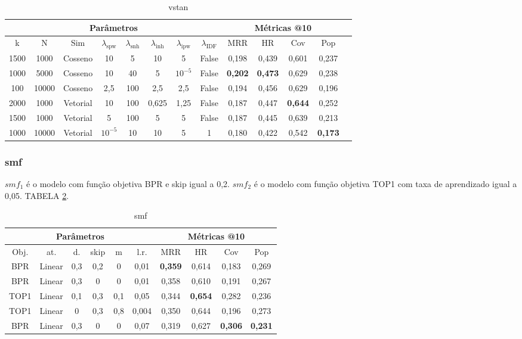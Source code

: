 \begin{table}[htbp]
    \centering
    \begin{tabular}{|c|c|c|c|c|c|c|c|c|c|c|c|c|}
      \hline
      \multicolumn{8}{|c|}{Parâmetros} & \multicolumn{4}{c|}{Métricas @10} \\
      \hline
      k & N & Sim & $\lambda_{\text{spw}}$ & $\lambda_{\text{snh}}$ & $\lambda_{\text{inh}}$ & $\lambda_{\text{ipw}}$ & $\lambda_{\text{IDF}}$ & MRR & HR & Cov & Pop \\
      \hline
      1500 & 1000 & Cosseno & 10 & 5 & 10 & 5 & False & 0,198 & 0,439 & 0,601 & 0,237 \\
      \hline
      1000 & 5000 & Cosseno & 10 & 40 & 5 & $10^{-5}$ & False & \textbf{0,202} & \textbf{0,473} & 0,629 & 0,238 \\
      \hline
      100 & 10000 & Cosseno & 2,5 & 100 & 2,5 & 2,5 & False & 0,194 & 0,456 & 0,629 & 0,196 \\
      \hline
      2000 & 1000 & Vetorial & 10 & 100 & 0,625 & 1,25 & False & 0,187 & 0,447 & \textbf{0,644} & 0,252 \\
      \hline
      1500 & 1000 & Vetorial & 5 & 100 & 5 & 5 & False & 0,187 & 0,445 & 0,639 & 0,213 \\
      \hline
      1000 & 10000 & Vetorial & $10^{-5}$ & 10 & 10 & 5 & 1 & 0,180 & 0,422 & 0,542 & \textbf{0,173} \\
      \hline
    \end{tabular}
    \caption{vstan}
    \label{app:vstan2}
  \end{table}

\subsubsection{smf}
$smf_{1}$ é o modelo com função objetiva BPR e skip igual a 0,2.
$smf_{2}$ é o modelo com função objetiva TOP1 com taxa de aprendizado igual a 0,05.
TABELA \ref{app:smf2}.
\begin{table}[htbp]
  \centering
  \begin{tabular}{|c|c|c|c|c|c|c|c|c|c|}
    \hline
      \multicolumn{6}{|c|}{Parâmetros} & \multicolumn{4}{c|}{Métricas @10} \\
      \hline
      Obj. & at. & d. & skip & m & l.r. & MRR & HR & Cov & Pop \\
      \hline
      BPR & Linear & 0,3 & 0,2 & 0 & 0,01 & \textbf{0,359} & 0,614 & 0,183 & 0,269 \\
      \hline
      BPR & Linear & 0,3 & 0 & 0 & 0,01 & 0,358 & 0,610 & 0,191 & 0,267 \\
      \hline
      TOP1 & Linear & 0,1 & 0,3 & 0,1 & 0,05 & 0,344 & \textbf{0,654} & 0,282 & 0,236 \\
      \hline
      TOP1 & Linear & 0 & 0,3 & 0,8 & 0,004 & 0,350 & 0,644 & 0,196 & 0,273 \\
      \hline
      BPR & Linear & 0,3 & 0 & 0 & 0,07 & 0,319 & 0,627 & \textbf{0,306} & \textbf{0,231} \\
      \hline
      \end{tabular}
      \caption{smf}
      \label{app:smf2}
\end{table}

